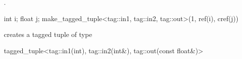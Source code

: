 \begin{addedblock}
\begin{itemdescr}
\pnum
\returns {}.

\pnum
\enterexample

\begin{codeblock}
int i; float j;
make_tagged_tuple<tag::in1, tag::in2, tag::out>(1, ref(i), cref(j))
\end{codeblock}

creates a tagged tuple of type

\begin{codeblock}
tagged_tuple<tag::in1(int), tag::in2(int&), tag::out(const float&)>
\end{codeblock}
\exitexample
\end{itemdescr}
\end{addedblock}
